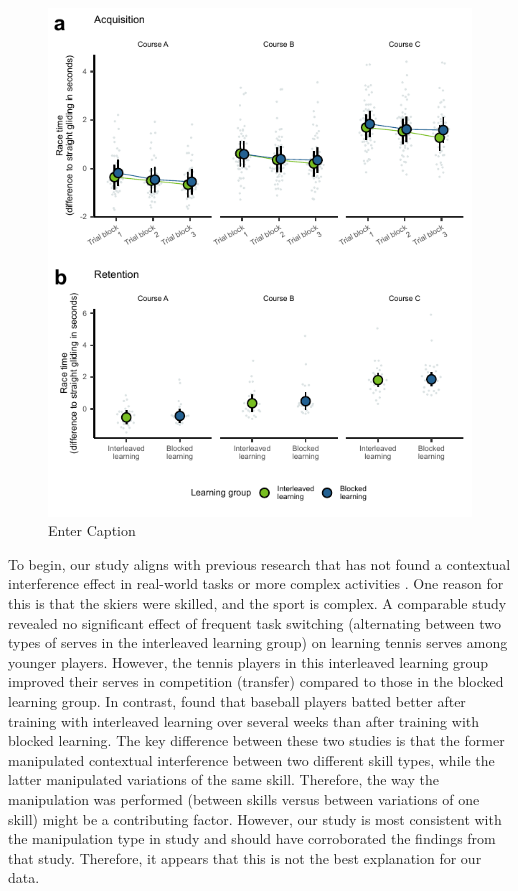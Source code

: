 \begin{figure}
    \centering
    \includegraphics[width=1\linewidth]{figure/figure_results_ci_acquisitionandretention.pdf}
    \caption{Enter Caption}
    \label{fig:ci_results}
\end{figure}

To begin, our study aligns with previous research that has not found a contextual interference effect in real-world tasks or more complex activities \cite{brady_theoretical_1998, barreiros_contextual_2007, wulf_principles_2002}. One reason for this is that the skiers were skilled, and the sport is complex. A comparable study revealed no significant effect of frequent task switching (alternating between two types of serves in the interleaved learning group) on learning tennis serves among younger players\cite{buszard_quantifying_2017}. However, the tennis players in this interleaved learning group improved their serves in competition (transfer) compared to those in the blocked learning group. In contrast, \cite{hall_contextual_1994} found that baseball players batted better after training with interleaved learning over several weeks than after training with blocked learning. The key difference between these two studies is that the former manipulated contextual interference between two different skill types, while the latter manipulated variations of the same skill. Therefore, the way the manipulation was performed (between skills versus between variations of one skill) might be a contributing factor. However, our study is most consistent with the manipulation type in \cite{hall_contextual_1994} study and should have corroborated the findings from that study. Therefore, it appears that this is not the best explanation for our data.

